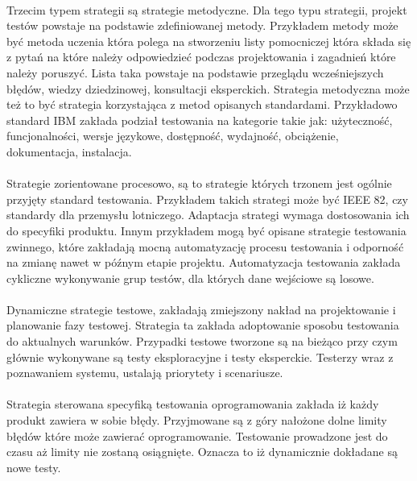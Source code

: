 \paragraph{}
Trzecim typem strategii są strategie metodyczne. Dla tego typu strategii, projekt testów powstaje na podstawie zdefiniowanej metody. Przykładem metody może być metoda uczenia która polega na stworzeniu listy pomocniczej która składa się z pytań na które należy odpowiedzieć podczas projektowania i zagadnień które należy poruszyć. Lista taka powstaje na podstawie przeglądu wcześniejszych błędów, wiedzy dziedzinowej, konsultacji eksperckich. Strategia metodyczna może też to być strategia korzystająca z metod opisanych standardami. Przykładowo standard IBM zakłada podział testowania na kategorie takie jak: użyteczność, funcjonalności, wersje językowe, dostępność, wydajność, obciążenie, dokumentacja, instalacja.
\paragraph{}
Strategie zorientowane procesowo, są to strategie których trzonem jest ogólnie przyjęty standard testowania. Przykładem takich strategi może być IEEE 82, czy standardy dla przemysłu lotniczego. Adaptacja strategi wymaga dostosowania ich do specyfiki produktu. Innym przykładem mogą być opisane strategie testowania zwinnego, które zakładają mocną automatyzację procesu testowania i odporność na zmianę nawet w późnym etapie projektu. Automatyzacja testowania zakłada cykliczne wykonywanie grup testów, dla których dane wejściowe są losowe.
\paragraph{}
Dynamiczne strategie testowe, zakładają zmiejszony nakład na projektowanie i planowanie fazy testowej. Strategia ta zakłada adoptowanie sposobu testowania do aktualnych warunków. Przypadki testowe tworzone są na bieżąco przy czym głównie wykonywane są testy eksploracyjne i testy eksperckie. Testerzy wraz z poznawaniem systemu, ustalają priorytety i scenariusze.
\paragraph{}
Strategia sterowana specyfiką testowania oprogramowania zakłada iż każdy produkt zawiera w sobie błędy. Przyjmowane są z góry nałożone dolne limity błędów które może zawierać oprogramowanie. Testowanie prowadzone jest do czasu aż limity nie zostaną osiągnięte. Oznacza to iż dynamicznie dokładane są nowe testy.

